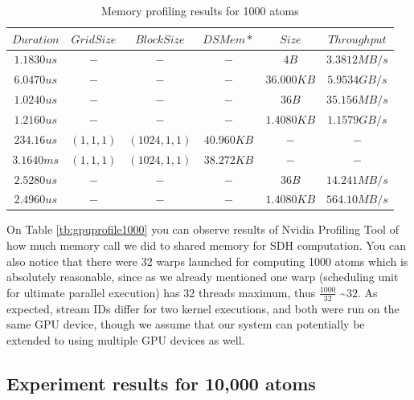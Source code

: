\documentclass[12pt,letterpaper]{report}
\begin{document}
\begin{table}[h!]
	\renewcommand*{\arraystretch}{1.5}
	\tabcolsep=0.12cm
  \centering
  \begin{tabular}{| c | c | c | c | c | c |}
   \hline

$Duration$ & $Grid Size$ & $Block Size$ & $DSMem*$ & $Size$ & $Throughput$ \\ \hline 
$1.1830us$ & $-$ & $-$ & $-$ & $4B$ & $3.3812MB/s$ \\ \hline 
$6.0470us$ & $-$ & $-$ & $-$ & $36.000KB$ & $5.9534GB/s$ \\ \hline 
$1.0240us$ & $-$ & $-$ & $-$ & $36B$ & $35.156MB/s$ \\ \hline 
$1.2160us$ & $-$ & $-$ & $-$ & $1.4080KB$ & $1.1579GB/s$ \\ \hline 
$234.16us$ & $(1,1,1)$ & $(1024,1,1)$ & $40.960KB$ & $-$ & $-$ \\ \hline 
$3.1640ms$ & $(1,1,1)$ & $(1024,1,1)$ & $38.272KB$ & $-$ & $-$ \\ \hline 
$2.5280us$ & $-$ & $-$ & $-$ & $36B$ & $14.241MB/s$ \\ \hline 
$2.4960us$ & $-$ & $-$ & $-$ & $1.4080KB$ & $564.10MB/s$ \\
	\hline

  \end{tabular}
    \caption{Memory profiling results for 1000 atoms}
    	  \label{tb:gpumem1000}
\end{table}

On Table \ref{tb:gpuprofile1000} you can observe results of Nvidia Profiling Tool of how much memory call we did to shared memory for SDH computation. You can also notice that there were 32 warps launched for computing 1000 atoms which is absolutely reasonable, since as we already mentioned one warp (scheduling unit for ultimate parallel execution) has 32 threads maximum, thus ${\frac{1000}{32}}$ \textasciitilde \space$32$. As expected, stream IDs differ for two kernel executions, and both were run on the same GPU device, though we assume that our system can potentially be extended to using multiple GPU devices as well.


\subsection{Experiment results for 10,000 atoms}
\end{document}
